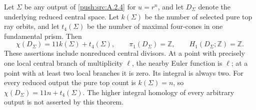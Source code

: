\begin{theorem}\label{push:src:A.4.7}\label{push:A47}
Let $\Sigma$ be any output of \ref{push:src:A.2.4} for $u=r^n$, and let
$D_\Sigma$ denote the underlying reduced central space.
Let $k(\Sigma)$ be the number of selected pure top ray
orbits, and let $t_4(\Sigma)$ be the number of maximal
four-cones in one fundamental prism. Then
\[
 \chi(D_\Sigma)=11k(\Sigma)+t_4(\Sigma),
 \qquad \pi_1(D_\Sigma)=\mathbb Z,
 \qquad H_1(D_\Sigma;\mathbb Z)=\mathbb Z.
\]
These assertions include nonreduced central divisors.
At a point with precisely one local central branch of
multiplicity $\ell$, the nearby Euler function is $\ell$;
at a point with at least two local branches it is zero.
Its integral is always two. For every reduced output the
pure top count is $k(\Sigma)=n$, so
$\chi(D_\Sigma)=11n+t_4(\Sigma)$.
The higher integral homology of every arbitrary output is
not asserted by this theorem.
\end{theorem}

